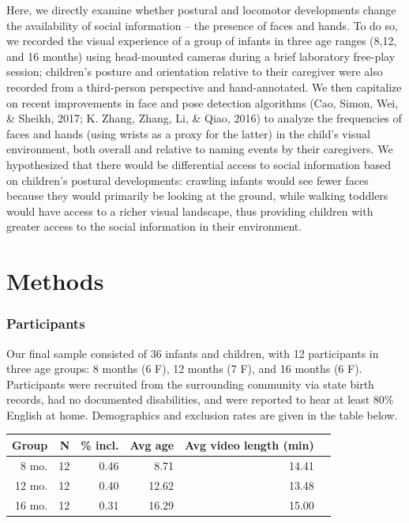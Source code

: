 \documentclass[10pt, letterpaper]{article}
\begin{document}
Here, we directly examine whether postural and locomotor developments
change the availability of social information -- the presence of faces
and hands. To do so, we recorded the visual experience of a group of
infants in three age ranges (8,12, and 16 months) using head-mounted
cameras during a brief laboratory free-play session; children's posture
and orientation relative to their caregiver were also recorded from a
third-person perspective and hand-annotated. We then capitalize on
recent improvements in face and pose detection algorithms (Cao, Simon,
Wei, \& Sheikh, 2017; K. Zhang, Zhang, Li, \& Qiao, 2016) to analyze the
frequencies of faces and hands (using wrists as a proxy for the latter)
in the child's visual environment, both overall and relative to naming
events by their caregivers. We hypothesized that there would be
differential access to social information based on children's postural
developments: crawling infants would see fewer faces because they would
primarily be looking at the ground, while walking toddlers would have
access to a richer visual landscape, thus providing children with
greater access to the social information in their environment.

\section{Methods}\label{methods}

\subsubsection{Participants}\label{participants}

Our final sample consisted of 36 infants and children, with 12
participants in three age groups: 8 months (6 F), 12 months (7 F), and
16 months (6 F). Participants were recruited from the surrounding
community via state birth records, had no documented disabilities, and
were reported to hear at least 80\% English at home. Demographics and
exclusion rates are given in the table below.

\begin{table}[ht]
\centering
\begin{tabular}{rrrrrr}
\hline
Group & N & \% incl. & Avg age & Avg video length (min) \\ 
\hline
8 mo. &   12 & 0.46 & 8.71 & 14.41 \\ 
12 mo. &  12 & 0.40 & 12.62 & 13.48 \\ 
16 mo. &  12 & 0.31 & 16.29 & 15.00\\ 
\hline
\end{tabular}
\end{table}
\end{document}

